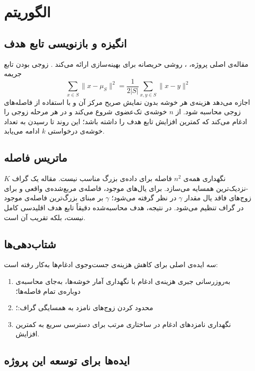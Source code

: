 \chapter{الگوریتم }

\section{انگیزه و بازنویسی تابع هدف}

مقاله‌ی اصلی پروژه، ، روشی حریصانه برای بهینه‌سازی
 ارائه می‌کند \cite{yuan2026}. زوجی بودن تابع جریمه
\begin{equation}
    \sum_{x\in S}\lVert x-\mu_S\rVert^2
    =
    \frac{1}{2|S|}
    \sum_{x,y\in S}\lVert x-y\rVert^2
    \label{eq:pairwise}
\end{equation}
اجازه می‌دهد هزینه‌ی هر خوشه بدون نمایش صریح مرکز آن و با استفاده از
فاصله‌های زوجی محاسبه شود.  از $n$ خوشه‌ی تک‌عضوی شروع می‌کند و در
هر مرحله زوجی را ادغام می‌کند که کمترین افزایش تابع هدف را داشته باشد؛ این
روند تا رسیدن به تعداد خوشه‌ی درخواستی $k$ ادامه می‌یابد.

\section{ماتریس فاصله}

نگهداری همه‌ی $n^2$ فاصله برای داده‌ی بزرگ مناسب نیست. مقاله یک گراف
$K$-نزدیک‌ترین همسایه می‌سازد. برای یال‌های موجود، فاصله‌ی مربع‌شده‌ی واقعی
و برای زوج‌های فاقد یال مقدار  $\gamma$ در نظر گرفته می‌شود؛
$\gamma$ بر مبنای بزرگ‌ترین فاصله‌ی موجود در گراف تنظیم می‌شود. در نتیجه،
هدف محاسبه‌شده دقیقاً تابع هدف اقلیدسی کامل نیست، بلکه تقریب آن
است. 

\section{شتاب‌دهی‌ها}

سه ایده‌ی اصلی برای کاهش هزینه‌ی جست‌وجوی ادغام‌ها به‌کار رفته است:
\begin{enumerate}
    \item به‌روزرسانی جبری هزینه‌ی ادغام با نگهداری آمار خوشه‌ها، به‌جای
          محاسبه‌ی دوباره‌ی تمام فاصله‌ها؛
    \item محدود کردن زوج‌های نامزد به همسایگی گراف:؛
    \item نگهداری نامزدهای ادغام در ساختاری مرتب برای دسترسی سریع به کمترین
          افزایش.
\end{enumerate}

\section{ایده‌ها برای توسعه این پروژه}

